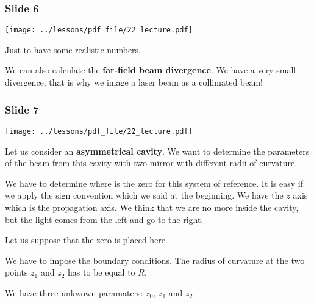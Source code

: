 \documentclass[../main/main.tex]{subfiles}
\begin{document}
\subsubsection*{Slide 6}

\begin{minipage}[]{0.5\linewidth}
\centering
\texttt{[image: ../lessons/pdf\_file/22\_lecture.pdf]}
\end{minipage}
\hspace{0.3cm}\vspace{0.3cm}
\begin{minipage}[c]{0.47\linewidth}

Just to have some realistic numbers.

We can also calculate the \textbf{far-field beam divergence}. We have a very small divergence, that is why we image a laser beam as a collimated beam!

\end{minipage}

\newpage

\subsubsection*{Slide 7}

\begin{minipage}[]{0.5\linewidth}
\centering
\texttt{[image: ../lessons/pdf\_file/22\_lecture.pdf]}
\end{minipage}
\hspace{0.3cm}\vspace{0.3cm}
\begin{minipage}[c]{0.47\linewidth}

Let us consider an \textbf{asymmetrical cavity}. We want to determine the parameters of the beam from this cavity with two mirror with different radii of curvature.

We have to determine where is the zero for this system of reference. It is easy if we apply the sign convention which we said at the beginning. We have the \( z \) axis which is the propagation axis. We think that we are no more inside the cavity, but the light comes from the left and go to the right.

Let us suppose that the zero is placed here.

We have to impose the boundary conditions. The radius of curvature at the two points \( z_1 \) and \( z_2 \) has to be equal to \( R \).

We have three unkwown paramaters: \( z_0 \), \( z_1 \) and \( z_2 \).

\end{minipage}
\end{document}
